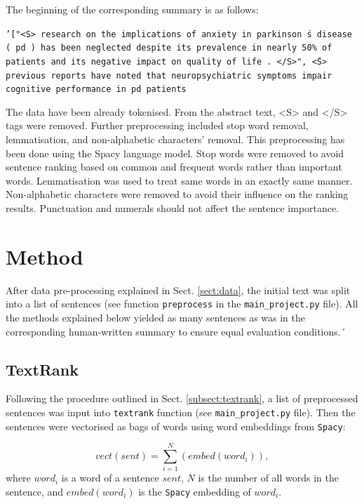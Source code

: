 \documentclass[11pt]{article}
\begin{document}
The beginning of the corresponding summary is as follows:

\texttt{'["<S> research on the implications of anxiety in parkinson \'s disease ( pd ) has been neglected despite its prevalence in nearly 50\% of patients and its negative impact on quality of life . </S>", \'<S> previous reports have noted that neuropsychiatric symptoms impair cognitive performance in pd patients }

The data have been already tokenised. From the abstract text, <S> and </S> tags were removed. Further preprocessing included stop word removal, lemmatisation, and non-alphabetic characters' removal. This preprocessing has been done using the Spacy language model. Stop words were removed to avoid sentence ranking based on common and frequent words rather than important words. Lemmatisation was used to treat same words in an exactly same manner. Non-alphabetic characters were removed to avoid their influence on the ranking results. Punctuation and numerals should not affect the sentence importance.
 

\section{Method}

After data pre-processing explained in Sect. \ref{sect:data}, the initial text was split into a list of sentences (see function \texttt{preprocess} in the \texttt{main\_project.py} file). All the methods explained below yielded as many sentences as was in the corresponding human-written summary to ensure equal evaluation conditions.´                                                                                                                                        
                                                                                                                                          
\subsection{TextRank}

Following the procedure outlined in Sect. \ref{subsect:textrank}, a list of preprocessed sentences was input into \texttt{textrank} function (see \texttt{main\_project.py} file). Then the sentences were vectorised as bags of words using word embeddings from \texttt{Spacy}:

\begin{equation}
 vect(sent) = \sum_{i = 1}^N (embed(word_i)),
\end{equation}
where $word_i$ is a word of a sentence $sent$, $N$ is the number of all words in the sentence, and $embed(word_i)$ is the \texttt{Spacy} embedding of $word_i$.
\end{document}
